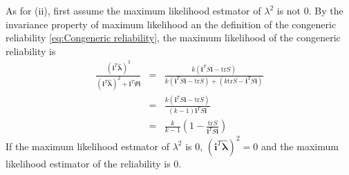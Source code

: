 \documentclass{article}
\makeatletter
\theoremstyle{plain}
\theoremstyle{plain}
\theoremstyle{definition}
\theoremstyle{remark}
\theoremstyle{definition}
\theoremstyle{plain}
\theoremstyle{plain}
\theoremstyle{definition}
\newenvironment{proof}[1][\protect\proofname]{\par
	\normalfont\topsep6\p@\@plus6\p@\relax
	\trivlist
	\itemindent\parindent
	\item[\hskip\labelsep\scshape #1]\ignorespaces
}{%
	\endtrivlist\@endpefalse
}
\providecommand{\proofname}{Proof}
\makeatother
\begin{document}
\begin{proof}[Proof of Theorem \ref{thm:ML}]
As for (ii), first assume the maximum likelihood estmator of $\lambda^{2}$
is not $0$. By the invariance property of maximum likelihood an the definition of the congeneric reliability \eqref{eq:Congeneric reliability}, the maximum likelihood of the congeneric reliability is
\begin{eqnarray*}
\frac{\left(\mathbf{i}^{T}\mathbf{\hat{\lambda}}\right)^{2}}{\left(\mathbf{i}^{T}\mathbf{\hat{\lambda}}\right)^{2}+\mathbf{i}^{T}\Psi\mathbf{i}} & = & \frac{k\left(\mathbf{i}^{T}S\mathbf{i}-\textrm{tr}S\right)}{k\left(\mathbf{i}^{T}S\mathbf{i}-\textrm{tr}S\right)+\left(k\textrm{tr}S-\mathbf{i}^{T}S\mathbf{i}\right)}\\
 & = & \frac{k\left(\mathbf{i}^{T}S\mathbf{i}-\textrm{tr}S\right)}{\left(k-1\right)\mathbf{i}^{T}S\mathbf{i}}\\
 & = & \frac{k}{k-1}\left(1-\frac{\textrm{tr}S}{\mathbf{i}^{T}S\mathbf{i}}\right)
\end{eqnarray*}
If the maximum likelihood estmator of $\lambda^{2}$ is $0$, $\left(\mathbf{i}^{T}\mathbf{\hat{\lambda}}\right)^{2}=0$
and the maximum likelihood estimator of the reliability is $0.$
\end{proof}
\end{document}

